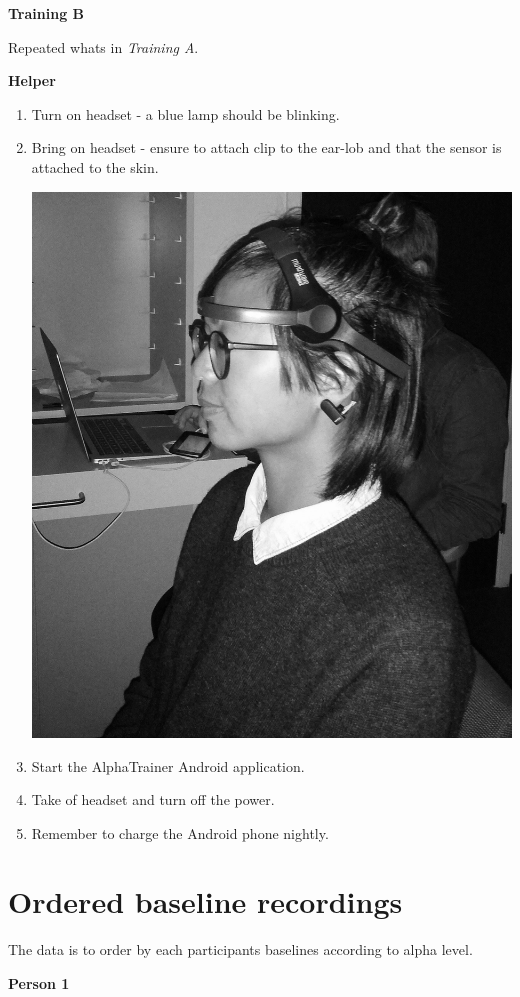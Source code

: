 \documentclass[a4paper,10pt,english,lof,lot,twoside]{puthesis}
\begin{document}
\textbf{Training B}

Repeated whats in \emph{Training A}.

\textbf{Helper}
\begin{enumerate}
\item {} 
Turn on headset - a blue lamp should be blinking.

\item {} 
Bring on headset - ensure to attach clip to the ear-lob and that the sensor is attached to the skin.

{\hfill\includegraphics[width=0.500\linewidth]{mindwave_mobile_setup.jpg}\hfill}

\item {} 
Start the AlphaTrainer Android application.

\item {} 
Take of headset and turn off the power.

\item {} 
Remember to charge the Android phone nightly.

\end{enumerate}


\section{Ordered baseline recordings}
\label{appendix_evaluation:ordered-baseline-recordings}\label{appendix_evaluation:appendix-final-evaluation-ordered-baseline-recordings}
The data is to order by each participants baselines according to alpha level.

\textbf{Person 1}
\end{document}
